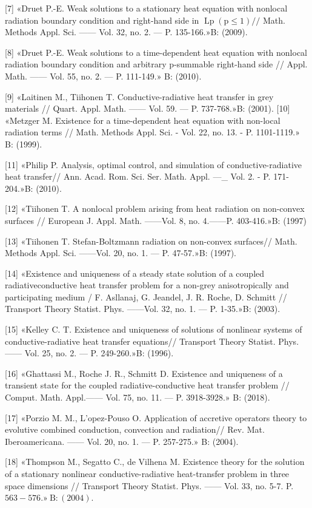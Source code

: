 \documentclass[10pt]{article}
\begin{document}
[7] «Druet P.-E. Weak solutions to a stationary heat equation with nonlocal radiation boundary condition and right-hand side in $\operatorname{Lp}(\mathrm{p} \leqslant 1) / /$ Math. Methods Appl. Sci. —— Vol. 32, no. 2. — P. 135-166.»B: (2009).

[8] «Druet P.-E. Weak solutions to a time-dependent heat equation with nonlocal radiation boundary condition and arbitrary p-summable right-hand side // Appl. Math. —— Vol. 55, no. 2. — P. 111-149.» B: (2010).

[9] «Laitinen M., Tiihonen T. Conductive-radiative heat transfer in grey materials // Quart. Appl. Math. —— Vol. 59. — P. 737-768.»B: (2001). [10] «Metzger M. Existence for a time-dependent heat equation with non-local radiation terms // Math. Methods Appl. Sci. - Vol. 22, no. 13. - P. 1101-1119.» B: (1999).

[11] «Philip P. Analysis, optimal control, and simulation of conductive-radiative heat transfer// Ann. Acad. Rom. Sci. Ser. Math. Appl. —\_ Vol. 2. - P. 171-204.»B: (2010).

[12] «Tiihonen T. A nonlocal problem arising from heat radiation on non-convex surfaces // European J. Appl. Math. ——Vol. 8, no. 4.——P. 403-416.»B: (1997)

[13] «Tiihonen T. Stefan-Boltzmann radiation on non-convex surfaces// Math. Methods Appl. Sci. ——Vol. 20, no. 1. — P. 47-57.»B: (1997).

[14] «Existence and uniqueness of a steady state solution of a coupled radiativeconductive heat transfer problem for a non-grey anisotropically and participating medium / F. Asllanaj, G. Jeandel, J. R. Roche, D. Schmitt // Transport Theory Statist. Phys. ——Vol. 32, no. 1. — P. 1-35.»B: (2003).

[15] «Kelley C. T. Existence and uniqueness of solutions of nonlinear systems of conductive-radiative heat transfer equations// Transport Theory Statist. Phys. —— Vol. 25, no. 2. — P. 249-260.»B: (1996).

[16] «Ghattassi M., Roche J. R., Schmitt D. Existence and uniqueness of a transient state for the coupled radiative-conductive heat transfer problem // Comput. Math. Appl.—— Vol. 75, no. 11. — P. 3918-3928.» B: (2018).

[17] «Porzio M. M., L'opez-Pouso O. Application of accretive operators theory to evolutive combined conduction, convection and radiation// Rev. Mat. Iberoamericana. —— Vol. 20, no. 1. — P. 257-275.» B: (2004).

[18] «Thompson M., Segatto C., de Vilhena M. Existence theory for the solution of a stationary nonlinear conductive-radiative heat-transfer problem in three space dimensions // Transport Theory Statist. Phys. —— Vol. 33, no. 5-7. P. $563-576 . » \mathrm{~B}:(2004)$.
\end{document}
